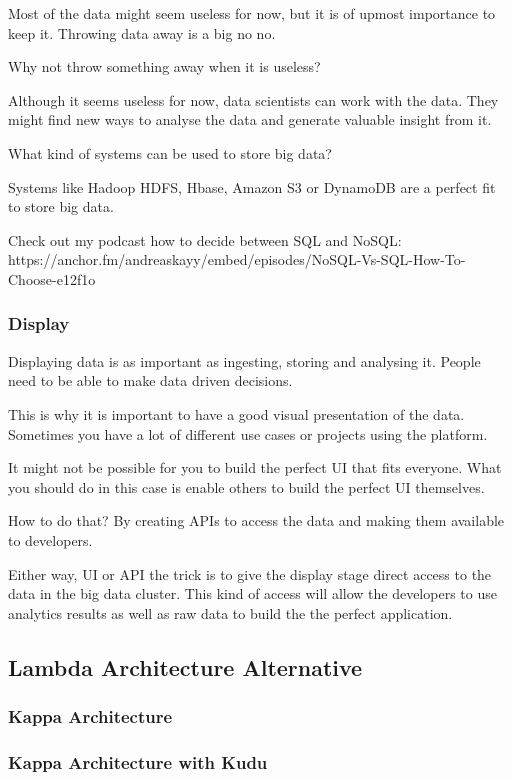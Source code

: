 \documentclass[12pt]{scrartcl} %
\begin{document}
Most of the data might seem useless for now, but it is of upmost importance to keep it. Throwing data away is a big no no.

Why not throw something away when it is useless?

Although it seems useless for now, data scientists can work with the data. They might find new ways to analyse the data and generate valuable insight from it.

What kind of systems can be used to store big data?

Systems like Hadoop HDFS, Hbase, Amazon S3 or DynamoDB are a perfect fit to store big data.

Check out my podcast how to decide between SQL and NoSQL: https://anchor.fm/andreaskayy/embed/episodes/NoSQL-Vs-SQL-How-To-Choose-e12f1o
 
\subsubsection{Display}
Displaying data is as important as ingesting, storing and analysing it. People need to be able to make data driven decisions.

This is why it is important to have a good visual presentation of the data. Sometimes you have a lot of different use cases or projects using the platform.

It might not be possible for you to build the perfect UI that fits everyone. What you should do in this case is enable others to build the perfect UI themselves.

How to do that? By creating APIs to access the data and making them available to developers.

Either way, UI or API the trick is to give the display stage direct access to the data in the big data cluster. This kind of access will allow the developers to use analytics results as well as raw data to build the the perfect application.

\subsection{Lambda Architecture Alternative }
\subsubsection{Kappa Architecture}
\subsubsection{Kappa Architecture with Kudu}
\end{document}

